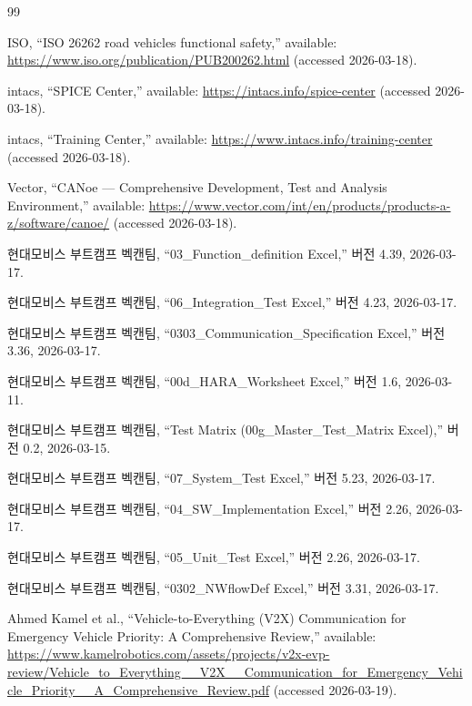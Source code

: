 \documentclass[11pt,a4paper]{article}
\begin{document}
\begin{thebibliography}{99}

ISO, ``ISO 26262 road vehicles functional safety,'' available: \url{https://www.iso.org/publication/PUB200262.html} (accessed 2026-03-18).

intacs, ``SPICE Center,'' available: \url{https://intacs.info/spice-center} (accessed 2026-03-18).

intacs, ``Training Center,'' available: \url{https://www.intacs.info/training-center} (accessed 2026-03-18).

Vector, ``CANoe --- Comprehensive Development, Test and Analysis Environment,'' available: \url{https://www.vector.com/int/en/products/products-a-z/software/canoe/} (accessed 2026-03-18).

현대모비스 부트캠프 벡캔팀, ``03\_Function\_definition Excel,'' 버전 4.39, 2026-03-17.

현대모비스 부트캠프 벡캔팀, ``06\_Integration\_Test Excel,'' 버전 4.23, 2026-03-17.

현대모비스 부트캠프 벡캔팀, ``0303\_Communication\_Specification Excel,'' 버전 3.36, 2026-03-17.

현대모비스 부트캠프 벡캔팀, ``00d\_HARA\_Worksheet Excel,'' 버전 1.6, 2026-03-11.

현대모비스 부트캠프 벡캔팀, ``Test Matrix (00g\_Master\_Test\_Matrix Excel),'' 버전 0.2, 2026-03-15.

현대모비스 부트캠프 벡캔팀, ``07\_System\_Test Excel,'' 버전 5.23, 2026-03-17.

현대모비스 부트캠프 벡캔팀, ``04\_SW\_Implementation Excel,'' 버전 2.26, 2026-03-17.

현대모비스 부트캠프 벡캔팀, ``05\_Unit\_Test Excel,'' 버전 2.26, 2026-03-17.

현대모비스 부트캠프 벡캔팀, ``0302\_NWflowDef Excel,'' 버전 3.31, 2026-03-17.

Ahmed Kamel et al., ``Vehicle-to-Everything (V2X) Communication for Emergency Vehicle Priority: A Comprehensive Review,'' available: \url{https://www.kamelrobotics.com/assets/projects/v2x-evp-review/Vehicle_to_Everything__V2X__Communication_for_Emergency_Vehicle_Priority__A_Comprehensive_Review.pdf} (accessed 2026-03-19).


\end{thebibliography}
\end{document}
